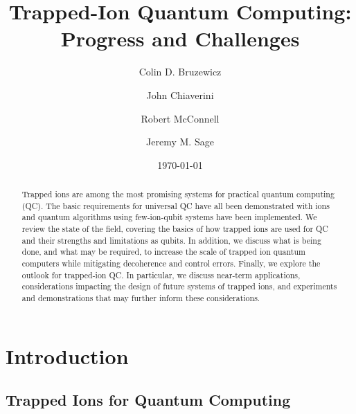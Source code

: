 \documentclass[%
reprint,
 amsmath,amssymb,
]{revtex4-1}
\begin{document}



\title{Trapped-Ion Quantum Computing: Progress and Challenges}
\author{Colin D. Bruzewicz}
\author{John Chiaverini}
\author{Robert McConnell}
\author{Jeremy M. Sage}



\date{\today}

\begin{abstract}
Trapped ions are among the most promising systems for practical quantum computing (QC).  The basic requirements for universal QC have all been demonstrated with ions and quantum algorithms using few-ion-qubit systems have been implemented.  We review the state of the field, covering the basics of how trapped ions are used for QC and their strengths and limitations as qubits.  In addition, we discuss what is being done, and what may be required, to increase the scale of trapped ion quantum computers while mitigating decoherence and control errors.  Finally, we explore the outlook for trapped-ion QC.  In particular, we discuss near-term applications, considerations impacting the design of future systems of trapped ions, and experiments and demonstrations that may further inform these considerations.

\end{abstract}


\maketitle
\tableofcontents
\section{Introduction}
\subsection{Trapped Ions for Quantum Computing}
\end{document}
